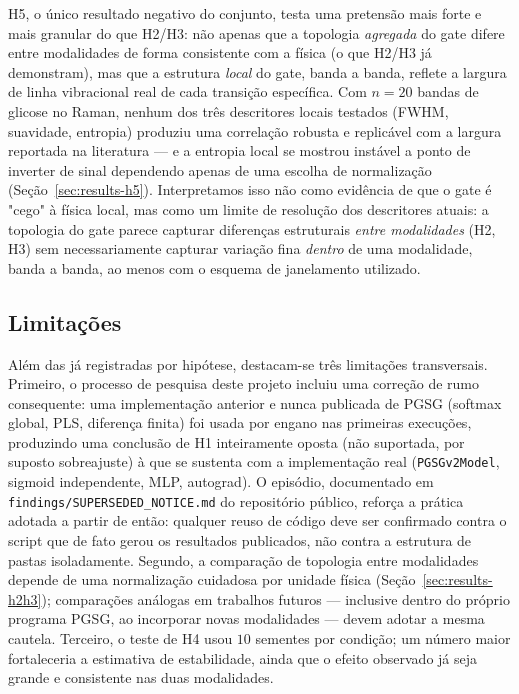 H5, o único resultado negativo do conjunto, testa uma pretensão mais forte e mais granular do que H2/H3: não apenas que a topologia \emph{agregada} do gate difere entre modalidades de forma consistente com a física (o que H2/H3 já demonstram), mas que a estrutura \emph{local} do gate, banda a banda, reflete a largura de linha vibracional real de cada transição específica. Com $n=20$ bandas de glicose no Raman, nenhum dos três descritores locais testados (FWHM, suavidade, entropia) produziu uma correlação robusta e replicável com a largura reportada na literatura --- e a entropia local se mostrou instável a ponto de inverter de sinal dependendo apenas de uma escolha de normalização (Seção~\ref{sec:results-h5}). Interpretamos isso não como evidência de que o gate é "cego" à física local, mas como um limite de resolução dos descritores atuais: a topologia do gate parece capturar diferenças estruturais \emph{entre modalidades} (H2, H3) sem necessariamente capturar variação fina \emph{dentro} de uma modalidade, banda a banda, ao menos com o esquema de janelamento utilizado.

\subsection{Limitações}

Além das já registradas por hipótese, destacam-se três limitações transversais. Primeiro, o processo de pesquisa deste projeto incluiu uma correção de rumo consequente: uma implementação anterior e nunca publicada de PGSG (softmax global, PLS, diferença finita) foi usada por engano nas primeiras execuções, produzindo uma conclusão de H1 inteiramente oposta (não suportada, por suposto sobreajuste) à que se sustenta com a implementação real (\texttt{PGSGv2Model}, sigmoid independente, MLP, autograd). O episódio, documentado em \texttt{findings/SUPERSEDED\_NOTICE.md} do repositório público, reforça a prática adotada a partir de então: qualquer reuso de código deve ser confirmado contra o script que de fato gerou os resultados publicados, não contra a estrutura de pastas isoladamente. Segundo, a comparação de topologia entre modalidades depende de uma normalização cuidadosa por unidade física (Seção~\ref{sec:results-h2h3}); comparações análogas em trabalhos futuros --- inclusive dentro do próprio programa PGSG, ao incorporar novas modalidades --- devem adotar a mesma cautela. Terceiro, o teste de H4 usou $10$ sementes por condição; um número maior fortaleceria a estimativa de estabilidade, ainda que o efeito observado já seja grande e consistente nas duas modalidades.

